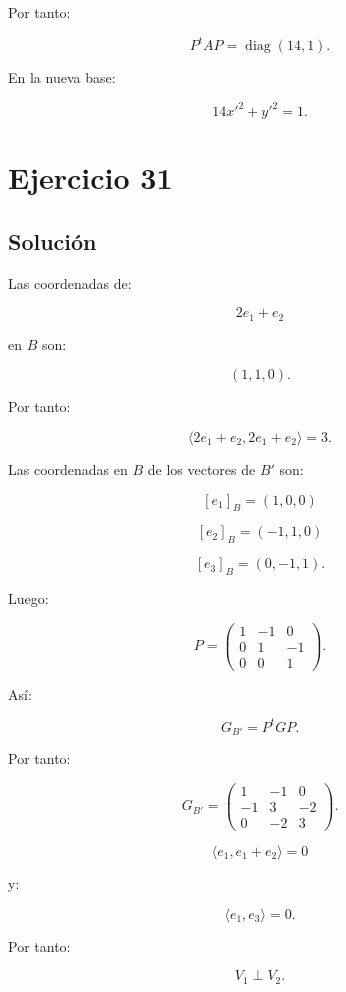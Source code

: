 \documentclass[11pt,a4paper]{article}
\newcommand{\diag}{\operatorname{diag}}
\begin{document}
Por tanto:

\[
\boxed{
P^tAP=
\diag(14,1).
}
\]

En la nueva base:

\[
\boxed{
14x'^2+y'^2=1.
}
\]

\section{Ejercicio 31}
\subsection{Solución}

Las coordenadas de:

\[
2e_1+e_2
\]

en $B$ son:

\[
(1,1,0).
\]

Por tanto:

\[
\boxed{
\langle2e_1+e_2,2e_1+e_2\rangle
=
3.
}
\]

Las coordenadas en $B$ de los vectores de $B'$ son:

\[
[e_1]_B=(1,0,0)
\]

\[
[e_2]_B=(-1,1,0)
\]

\[
[e_3]_B=(0,-1,1).
\]

Luego:

\[
P=
\begin{pmatrix}
1&-1&0\\
0&1&-1\\
0&0&1
\end{pmatrix}.
\]

Así:

\[
G_{B'}
=
P^tGP.
\]

Por tanto:

\[
\boxed{
G_{B'}
=
\begin{pmatrix}
1&-1&0\\
-1&3&-2\\
0&-2&3
\end{pmatrix}.
}
\]

\[
\langle e_1,e_1+e_2\rangle=0
\]

y:

\[
\langle e_1,e_3\rangle=0.
\]

Por tanto:

\[
\boxed{
V_1\perp V_2.
}
\]
\end{document}
